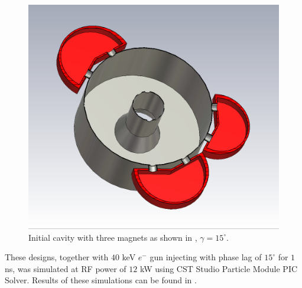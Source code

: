 \documentclass[a4paper,oneside,12pt]{report}
\numberwithin{equation}{chapter}
\begin{document}
\begin{figure}[H]
    \centering
    \includegraphics[width=.8\linewidth]{./figures/cst/cst_second_design2.png}
    \vspace{20pt}
    \caption{Initial cavity with three magnets as shown in , $\gamma=15^\circ$.}
    \label{fig:initial_three_magnet_design}
\end{figure}
These designs, together with $40$ keV $e^-$ gun injecting with phase lag of $15^\circ$ for $1$ ns, was simulated at RF power of $12$ kW using CST Studio Particle Module PIC Solver.
Results of these simulations can be found in .
\end{document}

